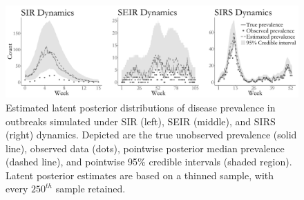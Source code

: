 \begin{figure}[!h]
	\centering
	\includegraphics[width=\linewidth]{figures/sim1_latent_posts.pdf}
	\caption{Estimated latent posterior distributions of disease prevalence in outbreaks simulated under SIR (left), SEIR (middle), and SIRS (right) dynamics. Depicted are the true unobserved prevalence (solid line), observed data (dots), pointwise posterior median prevalence (dashed line), and pointwise 95\% credible intervals (shaded region). Latent posterior estimates are based on a thinned sample, with every $250^{th}$ sample retained.}
	\label{fig:sim1_latent_posts}
\end{figure}

